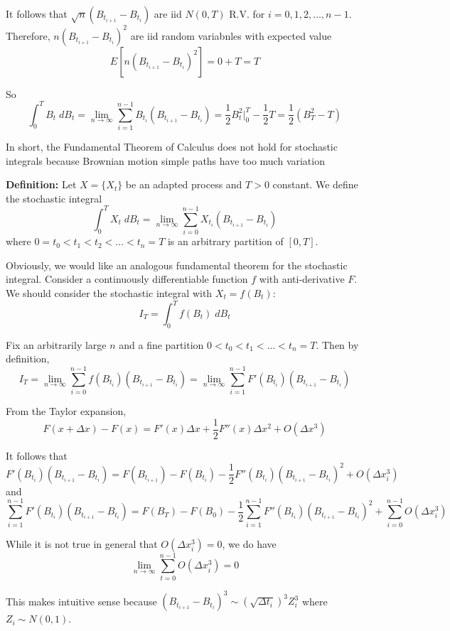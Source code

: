 \documentclass[12pt]{report}
\newcommand*{\tbf}[1]{\ifmmode\mathbf{#1}\else\textbf{#1}\fi}
\begin{document}
\begin{itemize}
        It follows that $\sqrt{n}(B_{t_{i+1}}- B_{t_i})$ are iid $N(0, T)$ R.V. for $i =0, 1, 2, \dots, n -1$. Therefore, $n(B_{t_{i+1}} - B_{t_i})^2$ are iid random variabnles with expected value 
        \[E[n(B_{t_{i+1}} - B_{t_i})^2] = 0 + T = T\]

        So 
        \[\int_0^T B_t \; d B_t = \lim_{n \to \infty} \sum_{i=1}^{n-1} B_{t_i}(B_{t_{i+1}} - B_{t_i}) = \frac{1}{2}B_t^2 \bigg\vert_0^T - \frac{1}{2} T = \frac{1}{2}(B_T^2 - T)\]

        In short, the Fundamental Theorem of Calculus does not hold for stochastic integrals because Brownian motion simple paths have too much variation
    
    \end{itemize}

    
    \tbf{Definition:} Let $X = \{X_t\}$ be an adapted process and $T>0$ constant. We define the stochastic integral
    \[\int_0^T X_t \; dB_t = \lim_{n \to \infty} \sum_{i=0}^{n-1} X_{t_i} (B_{t_{i+1}} - B_{t_i})\]
    where $0 = t_0 < t_1 < t_2 < \dots < t_n = T$ is an arbitrary partition of $[0, T]$. 

    Obviously, we would like an analogous fundamental theorem for the stochastic integral. Consider a continuously differentiable function $f$ with anti-derivative $F$. We should consider the stochastic integral with $X_t = f(B_t)$:
    \[I_T = \int_0^T f(B_t)\; dB_t\]

    Fix an arbitrarily large $n$ and a fine partition $0 < t_0 < t_1 < \dots < t_n = T$. Then by definition, 
    \[I_T = \lim_{n \to \infty} \sum_{i=0}^{n-1} f(B_{t_i}) (B_{t_{i+1}} - B_{t_i}) = \lim_{n \to \infty} \sum_{i=1}^{n-1} F'(B_{t_i})(B_{t_{i+1}} - B_{t_i}) \]

    From the Taylor expansion, 
    \[F(x + \Delta x) - F(x) = F'(x) \Delta x + \frac{1}{2} F''(x) \Delta x^2 + O(\Delta x^3)\]

    It follows that 
    \[F'(B_{t_i})(B_{t_{i+1}} - B_{t_i}) = F(B_{t_{i+1}}) - F(B_{t_i}) - \frac{1}{2}F''(B_{t_i})(B_{t_{i+1}} - B_{t_i})^2 + O(\Delta x_i^3)\]
    and 
    \[\sum_{i=1}^{n-1} F'(B_{t_i})(B_{t_{i+1}} - B_{t_i}) = F(B_T) - F(B_0) - \frac{1}{2}\sum_{i=1}^{n-1} F''(B_{t_i})(B_{t_{i+1}} - B_{t_i})^2 + \sum_{i=0}^{n -1} O(\Delta x_i^3)\]

    While it is not true in general that $O(\Delta x_i^3) = 0$, we do have 
    \[\lim_{n \to \infty} \sum_{t=0}^{n-1} O(\Delta x_i^3) = 0\]

    This makes intuitive sense because $(B_{t_{i+1}} - B_{t_i})^3 \sim (\sqrt{\Delta t_i})^3 Z_i^3$ where $Z_i \sim N(0, 1)$. 
\end{document}
